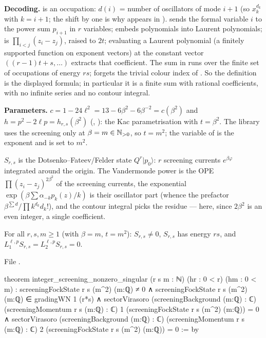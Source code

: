 \begin{dictionary}
\textbf{Decoding.}  is an occupation: $d(i)$ = number of oscillators of mode $i+1$ (so
$x_k^{d_k}$ with $k = i+1$; the shift by one is why  appears in ).
 sends the formal variable $i$ to the power sum $p_{i+1}$ in $r$ variables;
 embeds polynomials into Laurent polynomials;  is
$\prod_{i<j}(z_i-z_j)$, raised to $2t$; evaluating a Laurent polynomial (a finitely supported function on
exponent vectors) at the constant vector $((r-1)t+s,\dots)$ extracts that coefficient. The sum in
 runs over the finite set of occupations of energy $rs$; 
forgets the trivial colour index of . So the definition is the displayed formula; in
particular it is a finite sum with rational coefficients, with no infinite series and no contour integral.

\textbf{Parameters.} $c = 1-24\ell^2 = 13-6\beta^2-6\beta^{-2} = c(\beta^2)$ and
$h = p^2-2\ell p = h_{r,s}(\beta^2)$ (\allowbreak{}\allowbreak{}, \allowbreak{}\allowbreak{}): the
Kac parametrisation with $t = \beta^2$. The library uses the screening only at $\beta = m\in{\mathbb{N}}_{>0}$, so
$t = m^2$; the variable  of  is the exponent and is set to $m^2$.
\end{dictionary}

\begin{physics}
$S_{r,s}$ is the Dotsenko--Fateev/Felder state $Q^r|p_0\rangle$: $r$ screening currents $e^{\beta\varphi}$
integrated around the origin. The Vandermonde power is the OPE $\prod(z_i-z_j)^{2\beta^2}$ of the screening
currents, the exponential $\exp(\beta\sum\alpha_{-k}p_k(z)/k)$ is their oscillator part (whence the
prefactor $\beta^{\sum d}/\prod k^{d_k}d_k!$), and the contour integral picks the residue --- here, since
$2\beta^2$ is an even integer, a single coefficient.
\end{physics}

\begin{theorem}\label{l06:thm:screensing}
For all $r,s,m\ge1$ (with $\beta = m$, $t = m^2$): $S_{r,s}\ne0$, $S_{r,s}$ has energy $rs$, and
$L^{\ell,p}_1S_{r,s} = L^{\ell,p}_2S_{r,s} = 0$.
\end{theorem}

File .
\begin{leancode}
theorem integer_screening_nonzero_singular (r s m : ℕ) (hr : 0 < r) (hm : 0 < m) :
    screeningFockState r s (m^2) (m:ℚ) ≠ 0 ∧
    screeningFockState r s (m^2) (m:ℚ) ∈ gradingWN 1 (r*s) ∧
    sectorVirasoro (screeningBackground (m:ℚ) : ℂ)
      (screeningMomentum r s (m:ℚ) : ℂ) 1 (screeningFockState r s (m^2) (m:ℚ)) = 0 ∧
    sectorVirasoro (screeningBackground (m:ℚ) : ℂ)
      (screeningMomentum r s (m:ℚ) : ℂ) 2 (screeningFockState r s (m^2) (m:ℚ)) = 0 := by
\end{leancode}

